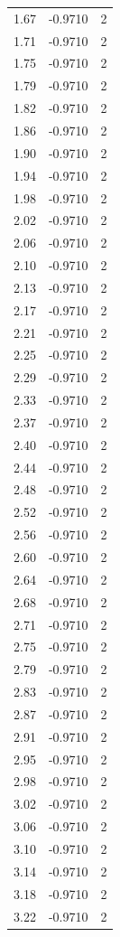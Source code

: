 \begin{longtable}{lrr}
  1.67 & -0.9710 & 2 \\
  1.71 & -0.9710 & 2 \\
  1.75 & -0.9710 & 2 \\
  1.79 & -0.9710 & 2 \\
  1.82 & -0.9710 & 2 \\
  1.86 & -0.9710 & 2 \\
  1.90 & -0.9710 & 2 \\
  1.94 & -0.9710 & 2 \\
  1.98 & -0.9710 & 2 \\
  2.02 & -0.9710 & 2 \\
  2.06 & -0.9710 & 2 \\
  2.10 & -0.9710 & 2 \\
  2.13 & -0.9710 & 2 \\
  2.17 & -0.9710 & 2 \\
  2.21 & -0.9710 & 2 \\
  2.25 & -0.9710 & 2 \\
  2.29 & -0.9710 & 2 \\
  2.33 & -0.9710 & 2 \\
  2.37 & -0.9710 & 2 \\
  2.40 & -0.9710 & 2 \\
  2.44 & -0.9710 & 2 \\
  2.48 & -0.9710 & 2 \\
  2.52 & -0.9710 & 2 \\
  2.56 & -0.9710 & 2 \\
  2.60 & -0.9710 & 2 \\
  2.64 & -0.9710 & 2 \\
  2.68 & -0.9710 & 2 \\
  2.71 & -0.9710 & 2 \\
  2.75 & -0.9710 & 2 \\
  2.79 & -0.9710 & 2 \\
  2.83 & -0.9710 & 2 \\
  2.87 & -0.9710 & 2 \\
  2.91 & -0.9710 & 2 \\
  2.95 & -0.9710 & 2 \\
  2.98 & -0.9710 & 2 \\
  3.02 & -0.9710 & 2 \\
  3.06 & -0.9710 & 2 \\
  3.10 & -0.9710 & 2 \\
  3.14 & -0.9710 & 2 \\
  3.18 & -0.9710 & 2 \\
  3.22 & -0.9710 & 2 \\

\end{longtable}
